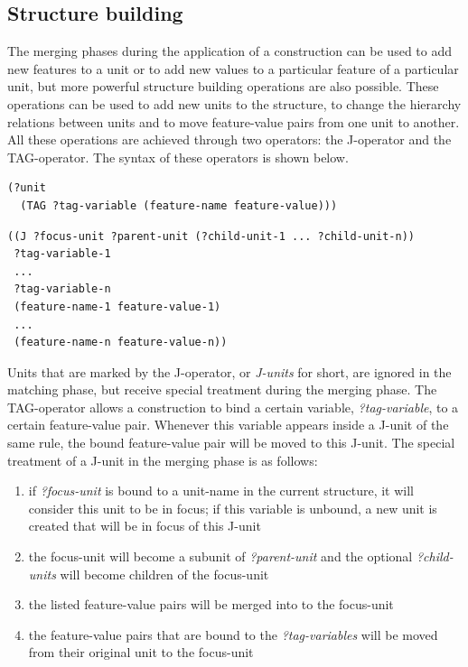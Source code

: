 \subsection{Structure building}

The merging phases during the application of a construction can be
used to add new features to a unit or to add new values to a
particular feature of a particular unit, but more powerful structure
building operations are also possible. These operations can be used to
add new units to the structure, to change the hierarchy relations
between units and to move feature-value pairs from one unit to
another. All these operations are achieved through two operators: the
J-operator \citep{debeule05hierarchy} and the TAG-operator. The syntax
of these operators is shown below.

\footnotesize
\begin{Verbatim}[frame=lines, label=Syntax of the TAG-operator]
(?unit
  (TAG ?tag-variable (feature-name feature-value)))
\end{Verbatim}

\begin{Verbatim}[frame=lines, label=Syntax of the J-operator]
((J ?focus-unit ?parent-unit (?child-unit-1 ... ?child-unit-n))
 ?tag-variable-1 
 ...
 ?tag-variable-n
 (feature-name-1 feature-value-1)
 ...
 (feature-name-n feature-value-n))
\end{Verbatim}
\normalsize

Units that are marked by the J-operator, or \emph{J-units} for short,
are ignored in the matching phase, but receive special treatment
during the merging phase. The TAG-operator allows a construction to
bind a certain variable, \emph{?tag-variable}, to a certain
feature-value pair. Whenever this variable appears inside a J-unit of
the same rule, the bound feature-value pair will be moved to this
J-unit. The special treatment of a J-unit in the merging phase is as
follows:

\begin{enumerate}
\item if \emph{?focus-unit} is bound to a unit-name in the current
  structure, it will consider this unit to be in focus; if this
  variable is unbound, a new unit is created that will be in focus of
  this J-unit
\item the focus-unit will become a subunit of \emph{?parent-unit} and
  the optional \emph{?child-units} will become children of the
  focus-unit
\item the listed feature-value pairs will be merged into to the
  focus-unit
\item the feature-value pairs that are bound to the
  \emph{?tag-variables} will be moved from their original unit to the
  focus-unit
\end{enumerate}

